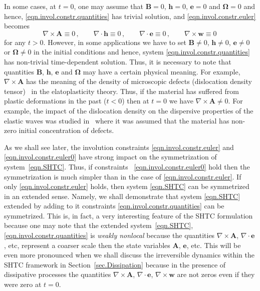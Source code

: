 \documentclass[twoside]{article}
\newcommand{\AAA}{{\boldsymbol{A}}}
\newcommand{\ww}{{\boldsymbol{w}}}
\newcommand{\ee}{{\boldsymbol{e}}}
\newcommand{\hh}{{\boldsymbol{h}}}
\newcommand{\BB}{{\boldsymbol{B}}}
\begin{document}
In some cases, at $ t = 0 $, one may assume that $ \BB = 0$, $ \hh 
= 0$, $ \ee = 0$
and $ \bm{\Omega} = 0$ and hence, \eqref{eqn.invol.constr.quantities} has 
trivial solution, and \eqref{eqn.invol.constr.euler} becomes 
\begin{equation}\label{eqn.invol.constr.euler0}
\nabla\times\AAA \equiv 0\,,\qquad 
\nabla\cdot\hh \equiv 0\,, \qquad 
\nabla\cdot\ee \equiv 0\,, \qquad
\nabla\times\ww\equiv 0\,
\end{equation}
for any $ t > 0 $. However, in some applications we have to set $ \BB \neq 0$, 
$ \hh \neq 0$,
$ \ee \neq 0$
or $ \bm{\Omega} \neq 0$ in the initial conditions and hence, system  
\eqref{eqn.invol.constr.quantities} has non-trivial time-dependent solution. 
Thus, it is 
necessary to note that quantities $ \BB $, $ \hh $, $ \ee $ and $ \bm{\Omega} $
may have a certain physical meaning. For example, $ \nabla\times\AAA $ has the 
meaning of the density of microscopic defects (dislocation density 
tensor)~\cite{GodRom1998,GodRom2003,PeshGrmRom2015} in the elatoplasticity 
theory. 
Thus, if the material has suffered from plastic deformations in the past ($ t < 
0 $) then at $ t = 0 $ we have $ \nabla\times\AAA\neq 0 $. For example, the 
impact of the dislocation density on the dispersive properties of the elastic 
waves was studied in~\cite{Romenski2011} where it was assumed that the material 
has non-zero initial concentration of defects.

As we shall see later, the involution constraints 
\eqref{eqn.invol.constr.euler} and \eqref{eqn.invol.constr.euler0} have strong 
impact on the symmetrization of system~\eqref{eqn.SHTC}. Thus, if constraints~ 
\eqref{eqn.invol.constr.euler0} hold then the symmetrization is much simpler 
than in the case of  \eqref{eqn.invol.constr.euler}. If only
\eqref{eqn.invol.constr.euler} holds, then system \eqref{eqn.SHTC} can be 
symmetrized in an extended sense. Namely, we shall demonstrate that 
system \eqref{eqn.SHTC} extended by adding to it constraints
\eqref{eqn.invol.constr.quantities} can be symmetrized. This is, in fact, a 
very 
interesting feature of the SHTC formulation because one may note that the 
extended system~\eqref{eqn.SHTC}, \eqref{eqn.invol.constr.quantities} is 
\textit{weakly nonlocal} because the quantities $ \nabla\times\AAA $, $ 
\nabla\cdot\ee $, etc, represent a coarser scale then the state variables $ 
\AAA $, $ \ee $, etc. This will be even more pronounced when we shall discuss 
the irreversible dynamics within the SHTC framework in 
Section~\ref{sec.Dissipation} because in the presence of dissipative processes 
the quantities $ \nabla\times\AAA $, $ \nabla\cdot\ee $, $ \nabla\times\ww $ 
are not zeros even if they were zero at $ t=0 $. 
\end{document}
